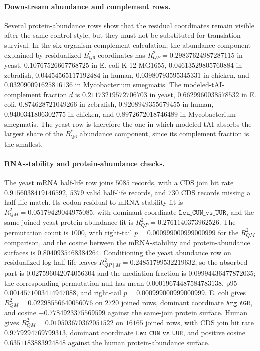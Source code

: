 \paragraph{Downstream abundance and complement rows.}
Several protein-abundance rows show that the residual coordinates remain visible after the same control style, but they must not be substituted for translation survival.  In the six-organism complement calculation, the abundance component explained by residualized $B^{\ast}_{Q6}$ coordinates has $R^2_{QP}=0.29837624987287115$ in yeast, $0.10767526667768725$ in E. coli K-12 MG1655, $0.04613529805760884$ in zebrafish, $0.04454565117192484$ in human, $0.03980793595345331$ in chicken, and $0.032090091625816136$ in Mycobacterium smegmatis.  The modeled-tAI-complement fraction $d$ is $0.21173219572706703$ in yeast, $0.6629960038578532$ in E. coli, $0.874628721049266$ in zebrafish, $0.9208949355679455$ in human, $0.9400341806302775$ in chicken, and $0.8972672018746489$ in Mycobacterium smegmatis.  The yeast row is therefore the one in which modeled tAI absorbs the largest share of the $B^{\ast}_{Q6}$ abundance component, since its complement fraction is the smallest.

\paragraph{RNA-stability and protein-abundance checks.}
The yeast mRNA half-life row joins $5085$ records, with a CDS join hit rate $0.9156038419146592$, $5379$ valid half-life records, and $730$ CDS records missing a half-life match.  Its codon-residual to mRNA-stability fit is $R^2_{QM}=0.05179429044975085$, with dominant coordinate $\texttt{Leu\_CUN\_vs\_UUR}$, and the same joined yeast protein-abundance fit is $R^2_{QP}=0.2761140373962526$.  The permutation count is $1000$, with right-tail $p=0.000999000999000999$ for the $R^2_{QM}$ comparison, and the cosine between the mRNA-stability and protein-abundance surfaces is $0.8040935468384264$.  Conditioning the yeast abundance row on residualized log half-life leaves $R^2_{QP\mid M}=0.24851799532219632$, so the absorbed part is $0.027596042074056304$ and the mediation fraction is $0.09994436477872035$; the corresponding permutation null has mean $0.00019674487584783138$, p95 $0.0014571003414947088$, and right-tail $p=0.000999000999000999$.  E. coli gives $R^2_{QM}=0.02298556640056076$ on $2720$ joined rows, dominant coordinate $\texttt{Arg\_AGR}$, and cosine $-0.7784923375569599$ against the same-join protein surface.  Human gives $R^2_{QM}=0.010503670362051522$ on $16165$ joined rows, with CDS join hit rate $0.9779294769799313$, dominant coordinate $\texttt{Leu\_CUN\_vs\_UUR}$, and positive cosine $0.6351183883924848$ against the human protein-abundance surface.


